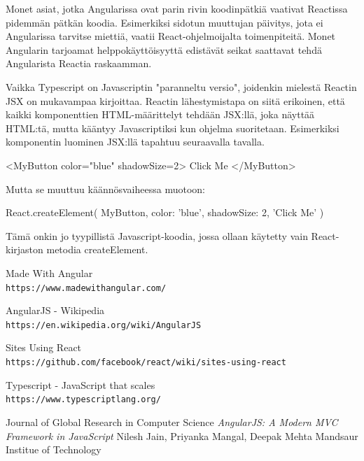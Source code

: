 \documentclass[a4paper,12pt,twoside]{article} %
\begin{document}
\vspace{4mm}\noindent
Monet asiat, jotka Angularissa ovat parin rivin koodinpätkiä vaativat Reactissa pidemmän pätkän koodia. Esimerkiksi sidotun muuttujan päivitys, jota ei Angularissa tarvitse miettiä, vaatii React-ohjelmoijalta toimenpiteitä. Monet Angularin tarjoamat helppokäyttöisyyttä edistävät seikat saattavat tehdä Angularista Reactia raskaamman.

\vspace{4mm}\noindent
Vaikka Typescript on Javascriptin "paranneltu versio", joidenkin mielestä Reactin JSX on mukavampaa kirjoittaa. Reactin lähestymistapa on siitä erikoinen, että kaikki komponenttien HTML-määrittelyt tehdään JSX:llä, joka näyttää HTML:tä, mutta kääntyy Javascriptiksi kun ohjelma suoritetaan. Esimerkiksi komponentin luominen JSX:llä tapahtuu seuraavalla tavalla.

\vspace{4mm}\noindent
<MyButton color="blue" shadowSize={2}>
  Click Me
</MyButton>

\vspace{4mm}\noindent
Mutta se muuttuu käännösvaiheessa muotoon:

\vspace{4mm}\noindent
React.createElement(
  MyButton,
  {color: 'blue', shadowSize: 2},
  'Click Me'
)

\vspace{4mm}\noindent
Tämä onkin jo tyypillistä Javascript-koodia, jossa ollaan käytetty vain React-kirjaston metodia createElement.

\newpage
\setcounter{secnumdepth}{0}

\begin{thebibliography}{9}

Made With Angular
\\\texttt{https://www.madewithangular.com/}

AngularJS - Wikipedia
\\\texttt{https://en.wikipedia.org/wiki/AngularJS}

Sites Using React
\\\texttt{https://github.com/facebook/react/wiki/sites-using-react}

Typescript - JavaScript that scales
\\\texttt{https://www.typescriptlang.org/}

Journal of Global Research in Computer Science
\textit{AngularJS: A Modern MVC Framework in JavaScript}
Nilesh Jain, Priyanka Mangal, Deepak Mehta
Mandsaur Institue of Technology

\end{thebibliography}
\end{document}
